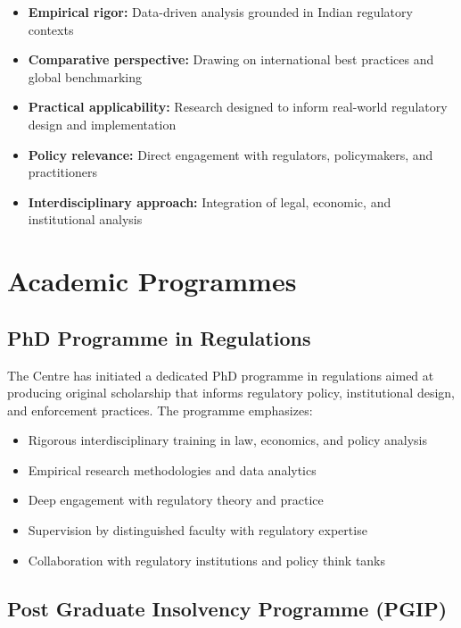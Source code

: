 \documentclass[11pt,a4paper]{article}
\begin{document}
\begin{itemize}[leftmargin=*,itemsep=0.2cm]
    \item \textbf{Empirical rigor:} Data-driven analysis grounded in Indian regulatory contexts
    \item \textbf{Comparative perspective:} Drawing on international best practices and global benchmarking
    \item \textbf{Practical applicability:} Research designed to inform real-world regulatory design and implementation
    \item \textbf{Policy relevance:} Direct engagement with regulators, policymakers, and practitioners
    \item \textbf{Interdisciplinary approach:} Integration of legal, economic, and institutional analysis
\end{itemize}

\clearpage

\section{Academic Programmes}

\subsection*{PhD Programme in Regulations}

The Centre has initiated a dedicated PhD programme in regulations aimed at producing original scholarship that informs regulatory policy, institutional design, and enforcement practices. The programme emphasizes:

\begin{itemize}[leftmargin=*,itemsep=0.2cm]
    \item Rigorous interdisciplinary training in law, economics, and policy analysis
    \item Empirical research methodologies and data analytics
    \item Deep engagement with regulatory theory and practice
    \item Supervision by distinguished faculty with regulatory expertise
    \item Collaboration with regulatory institutions and policy think tanks
\end{itemize}

\vspace{0.5cm}

\subsection*{Post Graduate Insolvency Programme (PGIP)}
\end{document}

